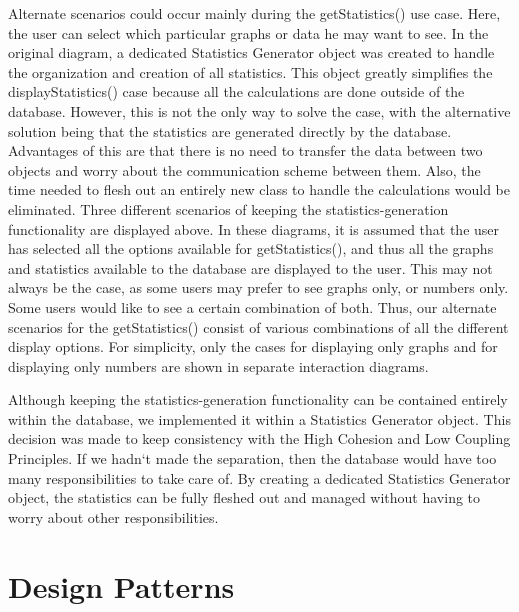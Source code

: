 \documentclass[letterpaper,english, 12pt]{scrreprt}
\begin{document}
Alternate scenarios could occur mainly during the getStatistics() use case. Here, the user can select which particular graphs or data he may want to see. In the original diagram, a dedicated Statistics Generator object was created to handle the organization and creation of all statistics. This object greatly simplifies the displayStatistics() case because all the calculations are done outside of the database. However, this is not the only way to solve the case, with the alternative solution being that the statistics are generated directly by the database. Advantages of this are that there is no need to transfer the data between two objects and worry about the communication scheme between them. Also, the time needed to flesh out an entirely new class to handle the calculations would be eliminated. Three different scenarios of keeping the statistics-generation functionality are displayed above. In these diagrams, it is assumed that the user has selected all the options available for getStatistics(), and thus all the graphs and statistics available to the database are displayed to the user. This may not always be the case, as some users may prefer to see graphs only, or numbers only. Some users would like to see a certain combination of both. Thus, our alternate scenarios for the getStatistics() consist of various combinations of all the different display options. For simplicity, only the cases for displaying only graphs and for displaying only numbers are shown in separate interaction diagrams. 

Although keeping the statistics-generation functionality can be contained entirely within the database, we implemented it within a Statistics Generator object. This decision was made to keep consistency with the High Cohesion and Low Coupling Principles. If we hadn`t made the separation, then the database would have too many responsibilities to take care of. By creating a dedicated Statistics Generator object, the statistics can be fully fleshed out and managed without having to worry about other responsibilities.

\section{Design Patterns}
\end{document}
